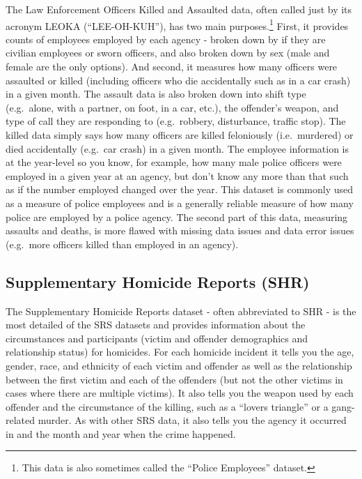 \documentclass[
  12pt,
  openany]{book}
\begin{document}
The Law Enforcement Officers Killed and Assaulted data, often called just by its acronym LEOKA (``LEE-OH-KUH''), has two main purposes.\footnote{This data is also sometimes called the ``Police Employees'' dataset.} First, it provides counts of employees employed by each agency - broken down by if they are civilian employees or sworn officers, and also broken down by sex (male and female are the only options). And second, it measures how many officers were assaulted or killed (including officers who die accidentally such as in a car crash) in a given month. The assault data is also broken down into shift type (e.g.~alone, with a partner, on foot, in a car, etc.), the offender's weapon, and type of call they are responding to (e.g.~robbery, disturbance, traffic stop). The killed data simply says how many officers are killed feloniously (i.e.~murdered) or died accidentally (e.g.~car crash) in a given month. The employee information is at the year-level so you know, for example, how many male police officers were employed in a given year at an agency, but don't know any more than that such as if the number employed changed over the year. This dataset is commonly used as a measure of police employees and is a generally reliable measure of how many police are employed by a police agency. The second part of this data, measuring assaults and deaths, is more flawed with missing data issues and data error issues (e.g.~more officers killed than employed in an agency).

\subsection{Supplementary Homicide Reports (SHR)}\label{supplementary-homicide-reports-shr}

The Supplementary Homicide Reports dataset - often abbreviated to SHR - is the most detailed of the SRS datasets and provides information about the circumstances and participants (victim and offender demographics and relationship status) for homicides. For each homicide incident it tells you the age, gender, race, and ethnicity of each victim and offender as well as the relationship between the first victim and each of the offenders (but not the other victims in cases where there are multiple victims). It also tells you the weapon used by each offender and the circumstance of the killing, such as a ``lovers triangle'' or a gang-related murder. As with other SRS data, it also tells you the agency it occurred in and the month and year when the crime happened.
\end{document}
